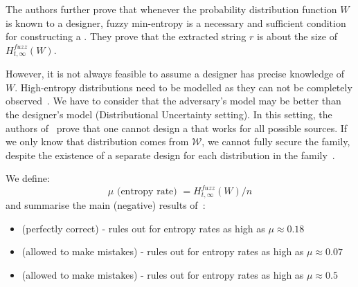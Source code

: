 The authors further prove that whenever the probability distribution function $W$ is known to a \fe designer, fuzzy min-entropy is a necessary and sufficient condition for constructing a \fe. They prove that the extracted string $r$ is about the size of $ H^{fuzz}_{t,\infty}(W)$.

However, it is not always feasible to assume a designer has precise knowledge of $W$. High-entropy distributions need to be modelled as they can not be completely observed~\cite{fe-when?}. We have to consider that the adversary's model may be better than the designer's model (Distributional Uncertainty setting). In this setting, the authors of~\cite{fe-when?} prove that one cannot design a \fe that works for all possible sources.
If we only know that distribution comes from $\mathcal{W}$, we cannot fully secure the family, despite the existence of a separate design for each distribution in the family~\cite{fe-when?}.


We define:
$$\mu \text{ (entropy rate) } = H^{fuzz}_{t,\infty}(W)/n$$
and summarise the main (negative) results of~\cite{fe-when?}:
\begin{itemize}
    \item \rep (perfectly correct) - rules out \fes for entropy rates as high as $\mu \approx 0.18$
    \item \rep (allowed to make mistakes) - rules out \fes for entropy rates as high as $\mu \approx 0.07$
    \item \rec (allowed to make mistakes) - rules out \sss for entropy rates as high as $\mu \approx 0.5$
\end{itemize}

